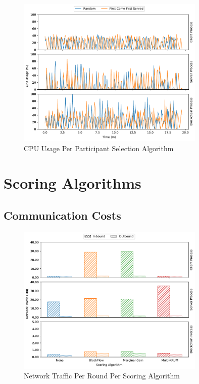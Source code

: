 \begin{figure}[!h]
    \centering
    \centering
    \includegraphics[width=0.8\textwidth]{graphics/selection/cpu.pdf}
    \caption{CPU Usage Per Participant Selection Algorithm}
    \label{fig:cpu_selection}
\end{figure}

\clearpage

\section{Scoring Algorithms}

\subsection{Communication Costs}

\vfill

\begin{figure}[!ht]
    \centering
    \centering
    \includegraphics[width=0.8\textwidth]{graphics/scoring/net.pdf}
    \caption{Network Traffic Per Round Per Scoring Algorithm}
    \label{fig:net_scoring}
\end{figure}

